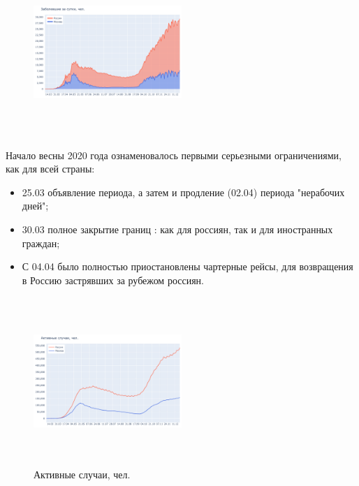 \documentclass[a4paper, 12pt]{extarticle}
\begin{document}
\begin{figure}
    \centering
    \vspace{-20pt}
    \includegraphics[height=180pt, width=0.50\textwidth]{../plots/1day_confirmed_russia_moscow.pdf}
    \label{fig:day_confirmed_russia_moscow}
\end{figure}

Начало весны 2020 года ознаменовалось первыми серьезными ограничениями, как для всей страны:

\begin{itemize}
    \item 25.03 объявление периода, а затем и продление (02.04) периода
        "нерабочих дней";
    \item 30.03 полное закрытие границ : как для россиян, так и для иностранных
        граждан;
    \item С 04.04 было полностью приостановлены чартерные рейсы, для
        возвращения в Россию застрявших за рубежом россиян.
\end{itemize}

\begin{figure}
    \centering
    \vspace{-20pt}
    \includegraphics[height=180pt, width=0.50\textwidth]{../plots/2active_cases_russia_moscow.pdf}
    \caption{Активные случаи, чел.}
    \label{fig:day_active_russia_moscow}
\end{figure}
\end{document}
